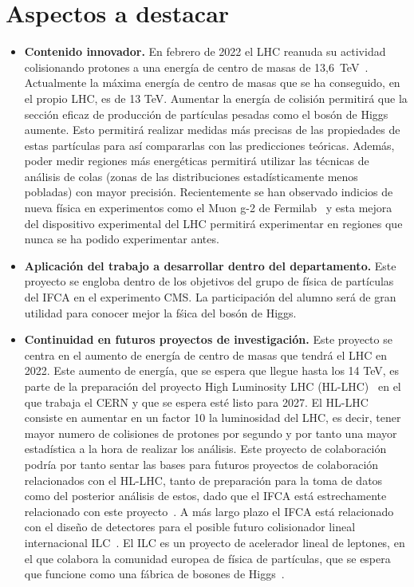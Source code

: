 \documentclass[11pt]{articulo}
\begin{document}
\section{Aspectos a destacar} 

\begin{itemize}

\item{{\bf Contenido innovador.} En febrero de 2022 el LHC reanuda su actividad colisionando protones a una energ\'ia de centro de masas de 13,6~TeV~\cite{HL}. Actualmente la m\'axima energ\'ia de centro de masas que se ha conseguido, en el propio LHC, es de 13 TeV. Aumentar la energ\'ia de colisi\'on permitir\'a que la secci\'on eficaz de producci\'on de part\'iculas pesadas como el bos\'on de Higgs aumente. Esto permitir\'a realizar medidas m\'as precisas de las propiedades de estas part\'iculas para as\'i compararlas con las predicciones te\'oricas. Adem\'as, poder medir regiones m\'as energ\'eticas permitir\'a utilizar las t\'ecnicas de an\'alisis de colas (zonas de las distribuciones estad\'isticamente menos pobladas) con mayor precisi\'on. Recientemente se han observado indicios de nueva f\'isica en experimentos como el Muon g-2 de Fermilab~\cite{g2} y esta mejora del dispositivo experimental del LHC permitir\'a experimentar en regiones que nunca se ha podido experimentar antes.}

\item{{\bf Aplicaci\'on del trabajo a desarrollar dentro del departamento.} Este proyecto se engloba dentro de los objetivos del grupo de f\'isica de part\'iculas del IFCA en el experimento CMS. La participaci\'on del alumno ser\'a de gran utilidad para conocer mejor la f\'sica del bos\'on de Higgs.}

\item{{\bf Continuidad en futuros proyectos de investigaci\'on.} Este proyecto se centra en el aumento de energ\'ia de centro de masas que tendr\'a el LHC en 2022. Este aumento de energ\'ia, que se espera que llegue hasta los 14 TeV, es parte de la preparaci\'on del proyecto High Luminosity LHC (HL-LHC)~\cite{HL} en el que trabaja el CERN y que se espera est\'e listo para 2027. El HL-LHC consiste en aumentar en un factor 10 la luminosidad del LHC, es decir, tener mayor numero de colisiones de protones por segundo y por tanto una mayor estad\'istica a la hora de realizar los an\'alisis. Este proyecto de colaboraci\'on podr\'ia por tanto sentar las bases para futuros proyectos de colaboraci\'on relacionados con el HL-LHC, tanto de preparaci\'on para la toma de datos como del posterior an\'alisis de estos, dado que el IFCA est\'a estrechamente relacionado con este proyecto~\cite{IFCA0}. A m\'as largo plazo el IFCA est\'a relacionado con el dise\~no de detectores para el posible futuro colisionador lineal internacional ILC~\cite{IFCA}. El ILC es un proyecto de acelerador lineal de leptones, en el que colabora la comunidad europea de f\'isica de part\'iculas, que se espera que funcione como una f\'abrica de bosones de Higgs~\cite{ILC}.}


\end{itemize}
\end{document}
